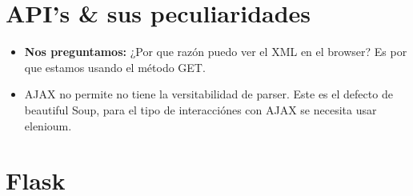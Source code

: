 \section{API's \& sus peculiaridades}
\begin{itemize}
\item \textbf{Nos preguntamos:} ¿Por que razón puedo ver el XML en el browser? Es por que estamos usando el método GET.
\item AJAX no permite no tiene la versitabilidad de parser. Este es el defecto de beautiful Soup, para el tipo de interacciónes con AJAX se necesita usar elenioum.
\end{itemize}

\section{Flask}
